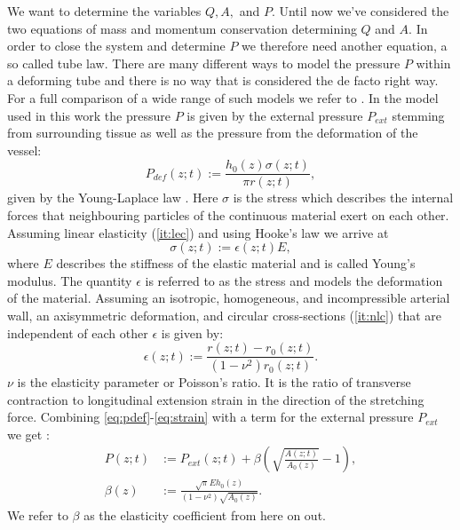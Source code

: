 \documentclass[a4paper, oneside]{discothesis}
\begin{document}
We want to determine the variables $Q, A,$ and $P$.
Until now we've considered the two equations of mass and momentum conservation determining $Q$ and $A$.
In order to close the system and determine $P$ we therefore need another equation, a so called tube law.
There are many different ways to model the pressure $P$ within a deforming tube and there is no way that is considered the de facto right way.
For a full comparison of a wide range of such models we refer to \cite{gomez2017analysis}.
In the model used in this work the pressure $P$ is given by the external pressure $P_{ext}$ stemming from surrounding tissue as well as the pressure from the deformation of the vessel:
\begin{equation}
	P_{def}(z;t) := \frac{h_0(z) \sigma(z;t)}{\pi r(z;t)}, \label{eq:pdef}
\end{equation}
given by the Young-Laplace law \cite{laplace1805traité} \cite{young1804essay}.
Here $\sigma$ is the stress which describes the internal forces that neighbouring particles of the continuous material exert on each other.
Assuming linear elasticity (\autoref{it:lec}) and using Hooke's law \cite{hooke1678lectures} we arrive at
\begin{equation}
	\sigma(z;t) := \epsilon(z;t) E \label{eq:stress},
\end{equation}
where $E$ describes the stiffness of the elastic material and is called Young's modulus.
The quantity $\epsilon$ is referred to as the stress and models the deformation of the material.
Assuming an isotropic, homogeneous, and incompressible arterial wall, an axisymmetric deformation, and circular cross-sections (\autoref{it:nlc}) that are independent of each other $\epsilon$ is given by:
\begin{equation}
	\epsilon(z;t) := \frac{r(z;t)-r_0(z;t)}{ (1-\nu^2) r_0(z;t)}. \label{eq:strain}
\end{equation}
$\nu$ is the elasticity parameter or Poisson's ratio.
It is the ratio of transverse contraction to longitudinal extension strain in the direction of the stretching force.
Combining \autoref{eq:pdef}-\autoref{eq:strain} with a term for the external pressure $P_{ext}$ we get \cite{sherwin2003one} \cite{sherwin2003computational}: 
\begin{align}
	P(z;t) &:= P_{ext}(z;t) + \beta \left( \sqrt{\frac{A(z;t)}{A_0(z)}}-1 \right),  \label{eq:p_tot}\\
	\beta(z) &:=  \frac{\sqrt{\pi} E h_0(z)}{(1-\nu^2) \sqrt{A_0(z)}}.
\end{align}
We refer to $\beta$ as the elasticity coefficient from here on out.
\end{document}
